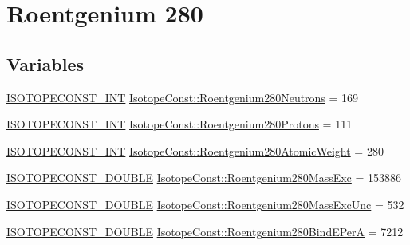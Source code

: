 \hypertarget{group___isotope_const-_roentgenium-_rg280}{}\section{Roentgenium 280}
\label{group___isotope_const-_roentgenium-_rg280}
\subsection*{Variables}
\begin{DoxyCompactItemize}
\item 
\mbox{\hyperlink{group___isotope_const-_macros_ga5f18360b3e99483a35c32d789e62621c}{I\+S\+O\+T\+O\+P\+E\+C\+O\+N\+S\+T\+\_\+\+I\+NT}} \mbox{\hyperlink{group___isotope_const-_roentgenium-_rg280_gac5ae1ed86665a81f07dfddb3cd9f3df5}{Isotope\+Const\+::\+Roentgenium280\+Neutrons}} = 169
\item 
\mbox{\hyperlink{group___isotope_const-_macros_ga5f18360b3e99483a35c32d789e62621c}{I\+S\+O\+T\+O\+P\+E\+C\+O\+N\+S\+T\+\_\+\+I\+NT}} \mbox{\hyperlink{group___isotope_const-_roentgenium-_rg280_gaeb8095c06f49bf5a256dc9f6c2245e0e}{Isotope\+Const\+::\+Roentgenium280\+Protons}} = 111
\item 
\mbox{\hyperlink{group___isotope_const-_macros_ga5f18360b3e99483a35c32d789e62621c}{I\+S\+O\+T\+O\+P\+E\+C\+O\+N\+S\+T\+\_\+\+I\+NT}} \mbox{\hyperlink{group___isotope_const-_roentgenium-_rg280_ga2a25e9a6b086f393ddcba626c3668ba7}{Isotope\+Const\+::\+Roentgenium280\+Atomic\+Weight}} = 280
\item 
\mbox{\hyperlink{group___isotope_const-_macros_ga8f45a7272ce02c0b4c65c44636ed719a}{I\+S\+O\+T\+O\+P\+E\+C\+O\+N\+S\+T\+\_\+\+D\+O\+U\+B\+LE}} \mbox{\hyperlink{group___isotope_const-_roentgenium-_rg280_ga8e92ebeecc84bdd71d4e322b2d32d19a}{Isotope\+Const\+::\+Roentgenium280\+Mass\+Exc}} = 153886
\item 
\mbox{\hyperlink{group___isotope_const-_macros_ga8f45a7272ce02c0b4c65c44636ed719a}{I\+S\+O\+T\+O\+P\+E\+C\+O\+N\+S\+T\+\_\+\+D\+O\+U\+B\+LE}} \mbox{\hyperlink{group___isotope_const-_roentgenium-_rg280_ga9c58b174967dc35ff6f5052ec7fcbcfe}{Isotope\+Const\+::\+Roentgenium280\+Mass\+Exc\+Unc}} = 532
\item 
\mbox{\hyperlink{group___isotope_const-_macros_ga8f45a7272ce02c0b4c65c44636ed719a}{I\+S\+O\+T\+O\+P\+E\+C\+O\+N\+S\+T\+\_\+\+D\+O\+U\+B\+LE}} \mbox{\hyperlink{group___isotope_const-_roentgenium-_rg280_gadbd6ed364ed78dc5329c17e709cf37b4}{Isotope\+Const\+::\+Roentgenium280\+Bind\+E\+PerA}} = 7212

\end{DoxyCompactItemize}
